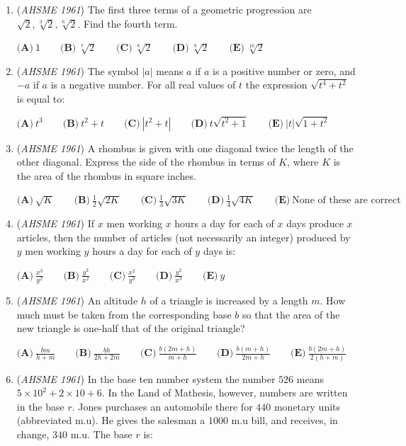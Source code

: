 \begin{enumerate}
	\item (\textit{AHSME 1961}) The first three terms of a geometric progression are $\sqrt{2}, \sqrt[3]{2}, \sqrt[6]{2}$. Find the fourth term.


 $\textbf{(A)}\ 1\qquad \textbf{(B)}\ \sqrt[7]{2}\qquad \textbf{(C)}\ \sqrt[8]{2}\qquad \textbf{(D)}\ \sqrt[9]{2}\qquad \textbf{(E)}\ \sqrt[10]{2}$


	\item (\textit{AHSME 1961}) The symbol $|a|$ means $a$ if $a$ is a positive number or zero, and $-a$ if $a$ is a negative number. 
For all real values of $t$ the expression $\sqrt{t^4+t^2}$ is equal to:


 $\textbf{(A)}\ t^3\qquad \textbf{(B)}\ t^2+t\qquad \textbf{(C)}\ |t^2+t|\qquad \textbf{(D)}\ t\sqrt{t^2+1}\qquad \textbf{(E)}\ |t|\sqrt{1+t^2}$


	\item (\textit{AHSME 1961}) A rhombus is given with one diagonal twice the length of the other diagonal. 
Express the side of the rhombus in terms of $K$, where $K$ is the area of the rhombus in square inches.


 $\textbf{(A)}\ \sqrt{K}\qquad \textbf{(B)}\ \frac{1}{2}\sqrt{2K}\qquad \textbf{(C)}\ \frac{1}{3}\sqrt{3K}\qquad \textbf{(D)}\ \frac{1}{4}\sqrt{4K}\qquad \textbf{(E)}\ \text{None of these are correct}$


	\item (\textit{AHSME 1961}) If $x$ men working $x$ hours a day for each of $x$ days produce $x$ articles, then the number of articles 
(not necessarily an integer) produced by $y$ men working $y$ hours a day for each of $y$ days is:


 $\textbf{(A)}\ \frac{x^3}{y^2}\qquad \textbf{(B)}\ \frac{y^3}{x^2}\qquad \textbf{(C)}\ \frac{x^2}{y^3}\qquad \textbf{(D)}\ \frac{y^2}{x^3}\qquad \textbf{(E)}\ y$


	\item (\textit{AHSME 1961}) An altitude $h$ of a triangle is increased by a length $m$. How much must be taken from the corresponding base $b$ 
so that the area of the new triangle is one-half that of the original triangle? 


 $\textbf{(A)}\ \frac{bm}{h+m}\qquad \textbf{(B)}\ \frac{bh}{2h+2m}\qquad \textbf{(C)}\ \frac{b(2m+h)}{m+h}\qquad \textbf{(D)}\ \frac{b(m+h)}{2m+h}\qquad \textbf{(E)}\ \frac{b(2m+h)}{2(h+m)}$


	\item (\textit{AHSME 1961}) In the base ten number system the number $526$ means $5 \times 10^2+2 \times 10 + 6$. 
In the Land of Mathesis, however, numbers are written in the base $r$. 
Jones purchases an automobile there for $440$ monetary units (abbreviated m.u). 
He gives the salesman a $1000$ m.u bill, and receives, in change, $340$ m.u. The base $r$ is:



\end{enumerate}
